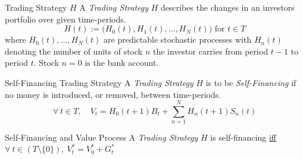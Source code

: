 \documentclass[11pt,a4paper]{article}
\begin{document}
  \begin{definition}{Trading Strategy $H$}
    A \textit{Trading Strategy} $H$ describes the changes in an investors portfolio over given time-periods.
    \[ H(t):=\big(H_0(t),H_1(t),\dots,H_N(t)\big)\text{ for }t\in T \]
    where $H_0(t),\dots,H_N(t)$ are predictable stochastic processes with $H_n(t)$ denoting the number of units of stock $n$ the investor carries from period $t-1$ to period $t$. Stock $n=0$ is the bank account.
  \end{definition}

  \begin{definition}{Self-Financing Trading Strategy}
    A \textit{Trading Strategy} $H$ is to be \textit{Self-Financing} if no money is introduced, or removed, between time-periods.
    \[ \forall\ t\in T,\quad V_t=H_0(t+1)B_t+\sum_{n=1}^NH_n(t+1)S_n(t) \]
  \end{definition}

  \begin{theorem}{Self-Financing and Value Process}\label{the_self_financing_and_value_process}
    A \textit{Trading Strategy} $H$ is self-financing \underline{iff} $\forall\ t\in(T\setminus\{0\}),\ V_t^*=V_0^*+G_t^*$
  \end{theorem}
\end{document}

